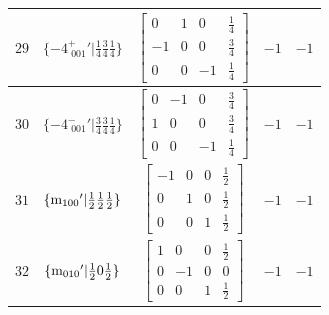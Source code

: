 \documentclass[fleqn,8pt]{jsarticle}
\begin{document}
\begin{longtable}{ccccc}
$ 29 $ & $ \{-4^{+}_{\,\,001}{}'|\frac{1}{4} \frac{3}{4} \frac{1}{4}\} $ & $ \begin{bmatrix} 0 & 1 & 0 & \frac{1}{4} \\ -1 & 0 & 0 & \frac{3}{4} \\ 0 & 0 & -1 & \frac{1}{4} \end{bmatrix} $ & $ -1 $ & $ -1 $ \\ \hline
$ 30 $ & $ \{-4^{-}_{\,\,001}{}'|\frac{3}{4} \frac{3}{4} \frac{1}{4}\} $ & $ \begin{bmatrix} 0 & -1 & 0 & \frac{3}{4} \\ 1 & 0 & 0 & \frac{3}{4} \\ 0 & 0 & -1 & \frac{1}{4} \end{bmatrix} $ & $ -1 $ & $ -1 $ \\ \hline
$ 31 $ & $ \{{\rm m}_{100}{}'|\frac{1}{2} \frac{1}{2} \frac{1}{2}\} $ & $ \begin{bmatrix} -1 & 0 & 0 & \frac{1}{2} \\ 0 & 1 & 0 & \frac{1}{2} \\ 0 & 0 & 1 & \frac{1}{2} \end{bmatrix} $ & $ -1 $ & $ -1 $ \\ \hline
$ 32 $ & $ \{{\rm m}_{010}{}'|\frac{1}{2} 0 \frac{1}{2}\} $ & $ \begin{bmatrix} 1 & 0 & 0 & \frac{1}{2} \\ 0 & -1 & 0 & 0 \\ 0 & 0 & 1 & \frac{1}{2} \end{bmatrix} $ & $ -1 $ & $ -1 $ \\
\end{longtable}
\end{document}

